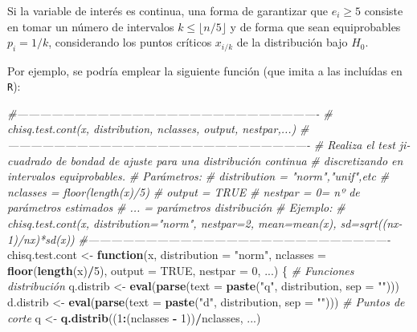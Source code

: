 \documentclass[
]{book}
\newenvironment{Shaded}{\begin{snugshade}}{\end{snugshade}}
\newcommand{\CommentTok}[1]{\textcolor[rgb]{0.56,0.35,0.01}{\textit{#1}}}
\newcommand{\ControlFlowTok}[1]{\textcolor[rgb]{0.13,0.29,0.53}{\textbf{#1}}}
\newcommand{\DataTypeTok}[1]{\textcolor[rgb]{0.13,0.29,0.53}{#1}}
\newcommand{\DecValTok}[1]{\textcolor[rgb]{0.00,0.00,0.81}{#1}}
\newcommand{\KeywordTok}[1]{\textcolor[rgb]{0.13,0.29,0.53}{\textbf{#1}}}
\newcommand{\NormalTok}[1]{#1}
\newcommand{\OperatorTok}[1]{\textcolor[rgb]{0.81,0.36,0.00}{\textbf{#1}}}
\newcommand{\OtherTok}[1]{\textcolor[rgb]{0.56,0.35,0.01}{#1}}
\newcommand{\StringTok}[1]{\textcolor[rgb]{0.31,0.60,0.02}{#1}}
\theoremstyle{break}
\theoremstyle{definition}
\theoremstyle{definition}
\theoremstyle{definition}
\theoremstyle{remark}
\begin{document}
Si la variable de interés es continua, una forma de garantizar que \(e_{i}\geq5\) consiste en tomar un número de intervalos \(k\leq \lfloor n/5 \rfloor\) y de forma que sean equiprobables \(p_{i}=1/k\),
considerando los puntos críticos \(x_{i/k}\) de la distribución bajo \(H_0\).

Por ejemplo, se podría emplear la siguiente función (que imita a las incluídas en \texttt{R}):

\begin{Shaded}
\begin{Highlighting}[]
\CommentTok{#-------------------------------------------------------------------------------}
\CommentTok{# chisq.test.cont(x, distribution, nclasses, output, nestpar,...)}
\CommentTok{#-------------------------------------------------------------------------------}
\CommentTok{# Realiza el test ji-cuadrado de bondad de ajuste para una distribución continua}
\CommentTok{# discretizando en intervalos equiprobables.}
\CommentTok{# Parámetros:}
\CommentTok{#   distribution = "norm","unif",etc}
\CommentTok{#   nclasses = floor(length(x)/5)}
\CommentTok{#   output = TRUE}
\CommentTok{#   nestpar = 0= nº de parámetros estimados}
\CommentTok{#   ... = parámetros distribución}
\CommentTok{# Ejemplo:}
\CommentTok{#   chisq.test.cont(x, distribution="norm", nestpar=2, mean=mean(x), sd=sqrt((nx-1)/nx)*sd(x))}
\CommentTok{#-------------------------------------------------------------------------------}
\NormalTok{chisq.test.cont <-}\StringTok{ }\ControlFlowTok{function}\NormalTok{(x, }\DataTypeTok{distribution =} \StringTok{"norm"}\NormalTok{, }\DataTypeTok{nclasses =} \KeywordTok{floor}\NormalTok{(}\KeywordTok{length}\NormalTok{(x)}\OperatorTok{/}\DecValTok{5}\NormalTok{), }
    \DataTypeTok{output =} \OtherTok{TRUE}\NormalTok{, }\DataTypeTok{nestpar =} \DecValTok{0}\NormalTok{, ...) \{}
    \CommentTok{# Funciones distribución}
\NormalTok{    q.distrib <-}\StringTok{ }\KeywordTok{eval}\NormalTok{(}\KeywordTok{parse}\NormalTok{(}\DataTypeTok{text =} \KeywordTok{paste}\NormalTok{(}\StringTok{"q"}\NormalTok{, distribution, }\DataTypeTok{sep =} \StringTok{""}\NormalTok{)))}
\NormalTok{    d.distrib <-}\StringTok{ }\KeywordTok{eval}\NormalTok{(}\KeywordTok{parse}\NormalTok{(}\DataTypeTok{text =} \KeywordTok{paste}\NormalTok{(}\StringTok{"d"}\NormalTok{, distribution, }\DataTypeTok{sep =} \StringTok{""}\NormalTok{)))}
    \CommentTok{# Puntos de corte}
\NormalTok{    q <-}\StringTok{ }\KeywordTok{q.distrib}\NormalTok{((}\DecValTok{1}\OperatorTok{:}\NormalTok{(nclasses }\OperatorTok{-}\StringTok{ }\DecValTok{1}\NormalTok{))}\OperatorTok{/}\NormalTok{nclasses, ...)}

\end{Highlighting}
\end{Shaded}
\end{document}
